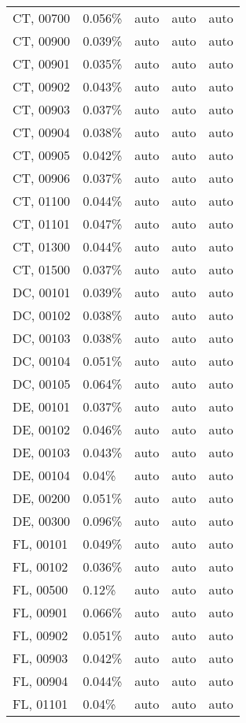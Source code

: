 \begin{longtable}[]{@{}lllll@{}}
CT, 00700 & 0.056\% & auto & auto & auto \\
CT, 00900 & 0.039\% & auto & auto & auto \\
CT, 00901 & 0.035\% & auto & auto & auto \\
CT, 00902 & 0.043\% & auto & auto & auto \\
CT, 00903 & 0.037\% & auto & auto & auto \\
CT, 00904 & 0.038\% & auto & auto & auto \\
CT, 00905 & 0.042\% & auto & auto & auto \\
CT, 00906 & 0.037\% & auto & auto & auto \\
CT, 01100 & 0.044\% & auto & auto & auto \\
CT, 01101 & 0.047\% & auto & auto & auto \\
CT, 01300 & 0.044\% & auto & auto & auto \\
CT, 01500 & 0.037\% & auto & auto & auto \\
DC, 00101 & 0.039\% & auto & auto & auto \\
DC, 00102 & 0.038\% & auto & auto & auto \\
DC, 00103 & 0.038\% & auto & auto & auto \\
DC, 00104 & 0.051\% & auto & auto & auto \\
DC, 00105 & 0.064\% & auto & auto & auto \\
DE, 00101 & 0.037\% & auto & auto & auto \\
DE, 00102 & 0.046\% & auto & auto & auto \\
DE, 00103 & 0.043\% & auto & auto & auto \\
DE, 00104 & 0.04\% & auto & auto & auto \\
DE, 00200 & 0.051\% & auto & auto & auto \\
DE, 00300 & 0.096\% & auto & auto & auto \\
FL, 00101 & 0.049\% & auto & auto & auto \\
FL, 00102 & 0.036\% & auto & auto & auto \\
FL, 00500 & 0.12\% & auto & auto & auto \\
FL, 00901 & 0.066\% & auto & auto & auto \\
FL, 00902 & 0.051\% & auto & auto & auto \\
FL, 00903 & 0.042\% & auto & auto & auto \\
FL, 00904 & 0.044\% & auto & auto & auto \\
FL, 01101 & 0.04\% & auto & auto & auto \\

\end{longtable}

